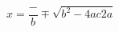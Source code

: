 \documentclass[preview]{standalone}
\begin{document}
\begin{center}
$x= \dfrac-b \mp \sqrt{b^2 - 4ac{2a}}$
\end{center}
\end{document}
